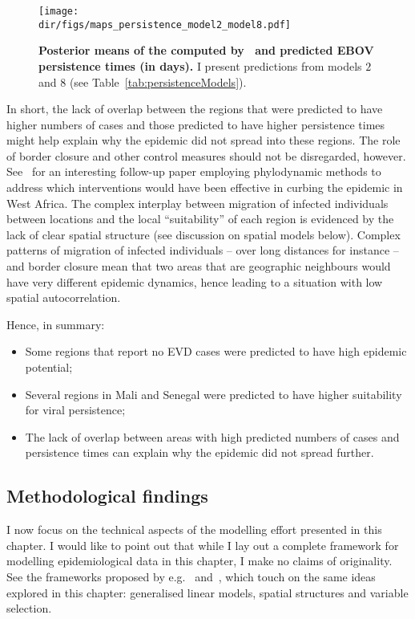 \begin{figure}[htbp]
  \centering
  \texttt{[image: \\dir/figs/maps\_persistence\_model2\_model8.pdf]}
  \caption[Persistence times predictions]{\textbf{Posterior means of the computed by~\cite{Dudas2017} and predicted EBOV persistence times (in days).}
  I present predictions from models $2$ and $8$ (see Table~\ref{tab:persistenceModels}).
  }
  \label{fig:mapsPersistence}
\end{figure}


In short, the lack of overlap between the regions that were predicted to have higher numbers of cases and those predicted to have higher persistence times might help explain why the epidemic did not spread into these regions.
The role of border closure and other control measures should not be disregarded, however.
See~\cite{Dellicour2017} for an interesting follow-up paper employing phylodynamic methods to address which interventions would have been effective in curbing the epidemic in West Africa.
The complex interplay between migration of infected individuals between locations and the local ``suitability'' of each region is evidenced by the lack of clear spatial structure (see discussion on spatial models below).
Complex patterns of migration of infected individuals -- over long distances for instance -- and border closure mean that two areas that are geographic neighbours would have very different epidemic dynamics, hence leading to a situation with low spatial autocorrelation.


Hence, in summary:
\begin{itemize}
 \item Some regions that report no EVD cases were  predicted to have high epidemic potential;
 \item Several regions in Mali and Senegal were predicted to have higher suitability for viral persistence;
 \item The lack of overlap between areas with high predicted numbers of cases and persistence times can explain why the epidemic did not spread further.
\end{itemize}

\subsection*{Methodological findings}

I now focus on the technical aspects of the modelling effort presented in this chapter.
I would like to point out that while I lay out a complete framework for modelling epidemiological data in this chapter, I make no claims of originality.
See the frameworks proposed by e.g.~\cite{Scheel2013} and~\cite{Boehm2015}, which touch on the same ideas explored in this chapter: generalised linear models, spatial structures and variable selection.

